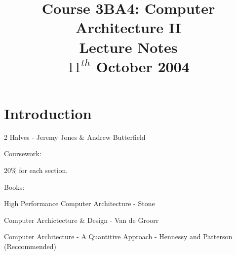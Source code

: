 \documentclass[a4paper,12pt]{article}
\begin{document}
\title{Course 3BA4: Computer Architecture II \\ Lecture Notes \\ $11^{th}$ October 2004}

\maketitle

\section*{Introduction}

2 Halves - Jeremy Jones \& Andrew Butterfield

Coursework:

$20\%$ for each section.

Books: 

High Performance Computer Architecture - Stone

Computer Archictecture \& Design - Van de Groorr

Computer Architecture - A Quantitive Approach - Hennessy and Patterson
(Reccommended)
\end{document}
